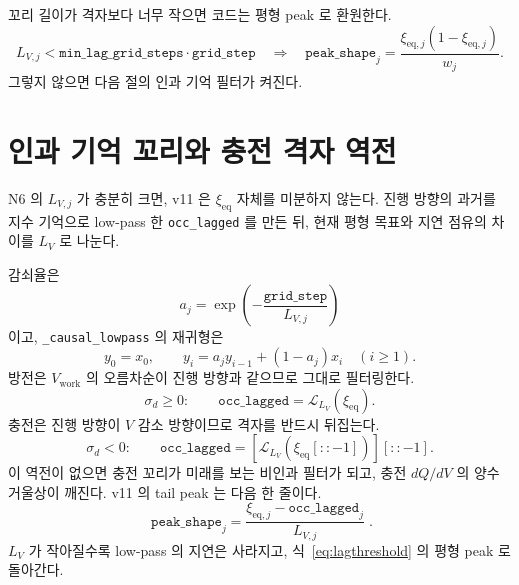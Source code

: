 \documentclass[11pt,a4paper]{article}
\newcommand{\eq}{\mathrm{eq}}
\newcommand{\work}{\mathrm{work}}
\begin{document}
꼬리 길이가 격자보다 너무 작으면 코드는 평형 peak 로 환원한다.
\begin{equation}
L_{V,j}<\texttt{min\_lag\_grid\_steps}\cdot\texttt{grid\_step}
\quad\Longrightarrow\quad
\texttt{peak\_shape}_j=\frac{\xi_{\eq,j}(1-\xi_{\eq,j})}{w_j}.
\label{eq:lagthreshold}
\end{equation}
그렇지 않으면 다음 절의 인과 기억 필터가 켜진다.

\section{인과 기억 꼬리와 충전 격자 역전}\label{sec:n7}
N6 의 $L_{V,j}$ 가 충분히 크면, v11 은 $\xi_{\eq}$ 자체를 미분하지 않는다. 진행 방향의 과거를 지수 기억으로 low-pass 한 \texttt{occ\_lagged} 를 만든 뒤, 현재 평형 목표와 지연 점유의 차이를 $L_V$ 로 나눈다.

감쇠율은
\begin{equation}
a_j=\exp\!\left(-\frac{\texttt{grid\_step}}{L_{V,j}}\right)
\label{eq:decay}
\end{equation}
이고, \texttt{\_causal\_lowpass} 의 재귀형은
\begin{equation}
y_0=x_0,\qquad
y_i=a_jy_{i-1}+(1-a_j)x_i\quad(i\ge1).
\label{eq:lowpass}
\end{equation}
방전은 $V_{\work}$ 의 오름차순이 진행 방향과 같으므로 그대로 필터링한다.
\begin{equation}
\sigma_d\ge0:\qquad
\texttt{occ\_lagged}=\mathcal L_{L_V}(\xi_{\eq}).
\label{eq:dislowpass}
\end{equation}
충전은 진행 방향이 $V$ 감소 방향이므로 격자를 반드시 뒤집는다.
\begin{equation}
\sigma_d<0:\qquad
\texttt{occ\_lagged}=
\left[\mathcal L_{L_V}\!\left(\xi_{\eq}[::-1]\right)\right][::-1].
\label{eq:chglowpass}
\end{equation}
이 역전이 없으면 충전 꼬리가 미래를 보는 비인과 필터가 되고, 충전 $dQ/dV$ 의 양수 거울상이 깨진다. v11 의 tail peak 는 다음 한 줄이다.
\begin{equation}
\boxed{\;\texttt{peak\_shape}_j=
\frac{\xi_{\eq,j}-\texttt{occ\_lagged}_j}{L_{V,j}}\;.}
\label{eq:tailpeak}
\end{equation}
$L_V$ 가 작아질수록 low-pass 의 지연은 사라지고, 식~\eqref{eq:lagthreshold} 의 평형 peak 로 돌아간다.
\end{document}
